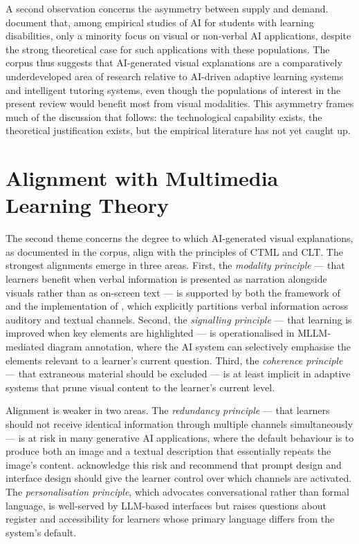 A second observation concerns the asymmetry between supply and demand. \citet{panjwani2024} document that, among empirical studies of AI for students with learning disabilities, only a minority focus on visual or non-verbal AI applications, despite the strong theoretical case for such applications with these populations. The corpus thus suggests that AI-generated visual explanations are a comparatively underdeveloped area of research relative to AI-driven adaptive learning systems and intelligent tutoring systems, even though the populations of interest in the present review would benefit most from visual modalities. This asymmetry frames much of the discussion that follows: the technological capability exists, the theoretical justification exists, but the empirical literature has not yet caught up.

\section{Alignment with Multimedia Learning Theory}

The second theme concerns the degree to which AI-generated visual explanations, as documented in the corpus, align with the principles of CTML and CLT. The strongest alignments emerge in three areas. First, the \emph{modality principle} --- that learners benefit when verbal information is presented as narration alongside visuals rather than as on-screen text --- is supported by both the framework of \citet{bewersdorff2024} and the implementation of \citet{osman2024}, which explicitly partitions verbal information across auditory and textual channels. Second, the \emph{signalling principle} --- that learning is improved when key elements are highlighted --- is operationalised in MLLM-mediated diagram annotation, where the AI system can selectively emphasise the elements relevant to a learner's current question. Third, the \emph{coherence principle} --- that extraneous material should be excluded --- is at least implicit in adaptive systems that prune visual content to the learner's current level.

Alignment is weaker in two areas. The \emph{redundancy principle} --- that learners should not receive identical information through multiple channels simultaneously --- is at risk in many generative AI applications, where the default behaviour is to produce both an image and a textual description that essentially repeats the image's content. \citet{bewersdorff2024} acknowledge this risk and recommend that prompt design and interface design should give the learner control over which channels are activated. The \emph{personalisation principle}, which advocates conversational rather than formal language, is well-served by LLM-based interfaces but raises questions about register and accessibility for learners whose primary language differs from the system's default.

